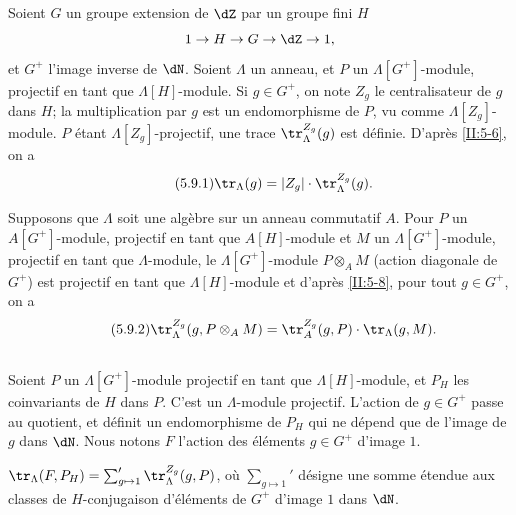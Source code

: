 \subsection{}\label{II:5-9}

Soient $G$ un groupe extension de $\dZ$ par un groupe fini $H$
\[
  1 \to H \to G \to \dZ \to 1 \text{,}
\]
et $G^+$ l'image inverse de $\dN$. Soient $\Lambda$ un anneau, et $P$ un 
$\Lambda[G^+]$-module, projectif en tant que $\Lambda[H]$-module. Si 
$g\in G^+$, on note $Z_g$ le centralisateur de $g$ dans $H$; la multiplication 
par $g$ est un endomorphisme de $P$, vu comme $\Lambda[Z_g]$-module. $P$ étant 
$\Lambda[Z_g]$-projectif, une trace $\tr_\Lambda^{Z_g}(g)$ est définie. 
D'après \ref{II:5-6}, on a 
\begin{equation*}\tag{5.9.1}\label{II:eq:5-9-1}
  \tr_\Lambda(g) = |Z_g| \cdot \tr_\Lambda^{Z_g}(g) \text{.}
\end{equation*}

Supposons que $\Lambda$ soit une algèbre sur un anneau commutatif $A$. Pour 
$P$ un $A[G^+]$-module, projectif en tant que $A[H]$-module et $M$ un 
$\Lambda[G^+]$-module, projectif en tant que $\Lambda$-module, le 
$\Lambda[G^+]$-module $P\otimes_A M$ (action diagonale de $G^+$) est projectif 
en tant que $\Lambda[H]$-module et d'après \ref{II:5-8}, pour tout 
$g\in G^+$, on a 
\begin{equation*}\tag{5.9.2}\label{II:eq:5-9-2}
  \tr_\Lambda^{Z_g}(g,P\otimes_A M) = \tr_A^{Z_g}(g,P) \cdot \tr_\Lambda(g,M) \text{.}
\end{equation*}





\subsection{}\label{II:5-10}

Soient $P$ un $\Lambda[G^+]$-module projectif en tant que $\Lambda[H]$-module, 
et $P_H$ les coinvariants de $H$ dans $P$. C'est un $\Lambda$-module projectif. 
L'action de $g\in G^+$ passe au quotient, et définit un endomorphisme de 
$P_H$ qui ne dépend que de l'image de $g$ dans $\dN$. Nous notons $F$ 
l'action des éléments $g\in G^+$ d'image $1$. 





\begin{proposition_}\label{II:5-11}
$\tr_\Lambda(F,P_H) = \sum_{g\mapsto 1}' \tr_\Lambda^{Z_g}(g,P)$, où 
$\sum_{g\mapsto 1}'$ désigne une somme étendue aux classes de 
$H$-conjugaison d'éléments de $G^+$ d'image $1$ dans $\dN$. 
\end{proposition_}

